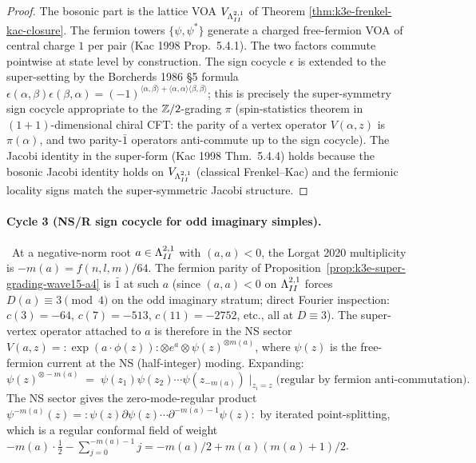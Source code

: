\begin{proof}
The bosonic part is the lattice VOA $V_{\Lambda^{2,1}_{II}}$ of Theorem
\ref{thm:k3e-frenkel-kac-closure}. The fermion towers
$\{\psi, \psi^*\}$ generate a charged free-fermion VOA of central
charge $1$ per pair (Kac 1998 Prop.~5.4.1). The two factors commute
pointwise at state level by construction. The sign cocycle
$\epsilon$ is extended to the super-setting by the Borcherds
1986 \S5 formula $\epsilon(\alpha, \beta) \epsilon(\beta, \alpha)
= (-1)^{\langle \alpha, \beta \rangle +
\langle \alpha, \alpha \rangle \langle \beta, \beta \rangle}$;
this is precisely the super-symmetry sign cocycle appropriate to the
$\mathbb{Z}/2$-grading $\pi$ (spin-statistics theorem in
$(1 + 1)$-dimensional chiral CFT: the parity of a vertex operator
$V(\alpha, z)$ is $\pi(\alpha)$, and two parity-$\bar 1$ operators
anti-commute up to the sign cocycle). The Jacobi identity in the
super-form (Kac 1998 Thm.~5.4.4) holds because the bosonic
Jacobi identity holds on $V_{\Lambda^{2,1}_{II}}$ (classical Frenkel--Kac) and
the fermionic locality signs match the super-symmetric Jacobi
structure.
\end{proof}

\smallskip

\paragraph{Cycle 3 (NS/R sign cocycle for odd imaginary simples).}
\ClaimStatusProvedHere\
At a negative-norm root $a \in \Lambda^{2,1}_{II}$ with $(a, a) < 0$, the
Lorgat 2020 multiplicity is $-m(a) = f(n, l, m)/64$. The
fermion parity of Proposition~\ref{prop:k3e-super-grading-wave15-a4}
is $\bar 1$ at such $a$ (since $(a, a) < 0$ on $\Lambda^{2,1}_{II}$ forces
$D(a) \equiv 3 \pmod 4$ on the odd imaginary stratum;
direct Fourier inspection: $c(3) = -64$, $c(7) = -513$,
$c(11) = -2752$, etc., all at $D \equiv 3$). The super-vertex
operator attached to $a$ is therefore in the NS sector
$V(a, z) = :\exp(a \cdot \phi(z)): \otimes e^a \otimes
\psi(z)^{\otimes m(a)}$, where $\psi(z)$ is the free-fermion
current at the NS (half-integer) moding. Expanding:
\[
  \psi(z)^{\otimes -m(a)}
  \;=\;
  \psi(z_1) \psi(z_2) \cdots \psi(z_{-m(a)})
  \;\Big|_{z_i = z}
  \;\text{(regular by fermion anti-commutation)}.
\]
The NS sector gives the zero-mode-regular product
$\psi^{-m(a)}(z) = {:}\psi(z) \partial \psi(z) \cdots
\partial^{-m(a) - 1}\psi(z){:}$ by iterated point-splitting, which is
a regular conformal field of weight
$-m(a) \cdot \frac{1}{2} - \sum_{j=0}^{-m(a)-1} j = -m(a)/2 + m(a)(m(a)+1)/2$.

